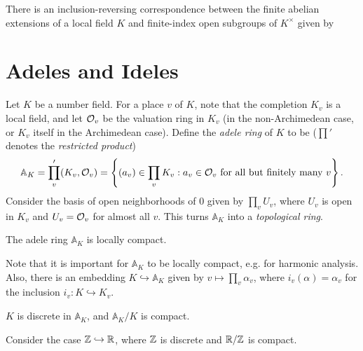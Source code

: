 \begin{theorem}
  There is an inclusion-reversing
  correspondence between the finite
  abelian extensions of a local field $K$ and
  finite-index open subgroups of $K^\times$
  given by
  \begin{center}
  \end{center}
\end{theorem}

\section{Adeles and Ideles}

\begin{definition}
  Let $K$ be a number field. For a place
  $v$ of $K$, note that the completion $K_v$ is
  a local field, and
  let $\mathcal{O}_v$ be the valuation ring in
  $K_v$ (in the non-Archimedean case, or
  $K_v$ itself in the Archimedean case).
  Define the \emph{adele ring} of $K$ to be
  ($\prod'$ denotes the \emph{restricted product})
  \[
    \mathbb{A}_K = \prod_v' (K_v, \mathcal{O}_v)
    = \left\{(a_v) \in \prod_v K_v : a_v \in \mathcal{O}_v \text{ for all but finitely many } v\right\}.
  \]
  Consider the basis of open neighborhoods
  of $0$ given by $\prod_v U_v$, where
  $U_v$ is open in $K_v$ and $U_v = \mathcal{O}_v$
  for almost all $v$. This turns
  $\mathbb{A}_K$ into a \emph{topological ring}.
\end{definition}

\begin{theorem}
  The adele ring $\mathbb{A}_K$ is locally
  compact.
\end{theorem}

\begin{remark}
  Note that it is important for $\mathbb{A}_K$
  to be locally compact, e.g. for harmonic
  analysis. Also,
  there is an embedding $K \hookrightarrow \mathbb{A}_K$
  given by
  $v \mapsto \prod_v \alpha_v$, where
  $i_v(\alpha) = \alpha_v$ for the inclusion
  $i_v : K \hookrightarrow K_v$.
\end{remark}

\begin{theorem}
  $K$ is discrete in $\mathbb{A}_K$, and
  $\mathbb{A}_K / K$ is compact.
\end{theorem}

\begin{example}
  Consider the case $\mathbb{Z} \hookrightarrow \mathbb{R}$,
  where $\mathbb{Z}$ is discrete and $\mathbb{R} / \mathbb{Z}$ is compact.
\end{example}

